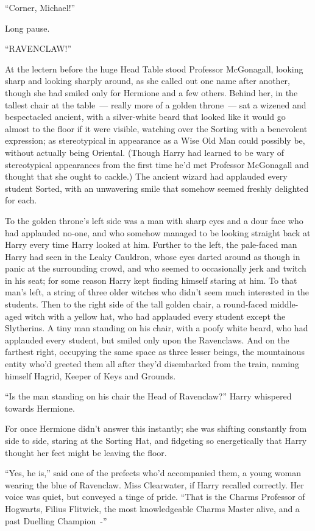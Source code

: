 ``Corner, Michael!''

Long pause.

``RAVENCLAW!''

At the lectern before the huge Head Table stood Professor McGonagall, looking sharp and looking sharply around, as she called out one name after another, though she had smiled only for Hermione and a few others. Behind her, in the tallest chair at the table~--- really more of a golden throne~--- sat a wizened and bespectacled ancient, with a silver-white beard that looked like it would go almost to the floor if it were visible, watching over the Sorting with a benevolent expression; as stereotypical in appearance as a Wise Old Man could possibly be, without actually being Oriental. (Though Harry had learned to be wary of stereotypical appearances from the first time he'd met Professor McGonagall and thought that she ought to cackle.) The ancient wizard had applauded every student Sorted, with an unwavering smile that somehow seemed freshly delighted for each.

To the golden throne's left side was a man with sharp eyes and a dour face who had applauded no-one, and who somehow managed to be looking straight back at Harry every time Harry looked at him. Further to the left, the pale-faced man Harry had seen in the Leaky Cauldron, whose eyes darted around as though in panic at the surrounding crowd, and who seemed to occasionally jerk and twitch in his seat; for some reason Harry kept finding himself staring at him. To that man's left, a string of three older witches who didn't seem much interested in the students. Then to the right side of the tall golden chair, a round-faced middle-aged witch with a yellow hat, who had applauded every student except the Slytherins. A tiny man standing on his chair, with a poofy white beard, who had applauded every student, but smiled only upon the Ravenclaws. And on the farthest right, occupying the same space as three lesser beings, the mountainous entity who'd greeted them all after they'd disembarked from the train, naming himself Hagrid, Keeper of Keys and Grounds.

``Is the man standing on his chair the Head of Ravenclaw?'' Harry whispered towards Hermione.

For once Hermione didn't answer this instantly; she was shifting constantly from side to side, staring at the Sorting Hat, and fidgeting so energetically that Harry thought her feet might be leaving the floor.

``Yes, he is,'' said one of the prefects who'd accompanied them, a young woman wearing the blue of Ravenclaw. Miss Clearwater, if Harry recalled correctly. Her voice was quiet, but conveyed a tinge of pride. ``That is the Charms Professor of Hogwarts, Filius Flitwick, the most knowledgeable Charms Master alive, and a past Duelling Champion~-''

